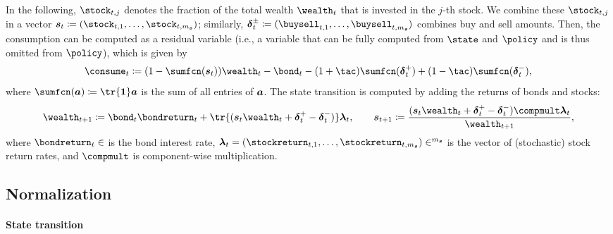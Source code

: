 In the following,
$\stock_{t,j}$ denotes the fraction of the total wealth $\wealth_t$
that is invested in the $j$-th stock.
We combine these  $\stock_{t,j}$
in a vector $\vstock_t \ceq (\stock_{t,1}, \dotsc, \stock_{t,m_{\vstock}})$;
similarly, $\vbuysell_t \ceq (\buysell_{t,1}, \dotsc, \buysell_{t,m_{\vstock}})$
combines buy and sell amounts.
Then, the consumption can be computed as a residual variable
(i.e., a variable that can be fully computed from $\state$ and $\policy$
and is thus omitted from $\policy$),
which is given by
\begin{equation}
  \consume_t
  \ceq (1 - \sumfcn(\vstock_t)) \wealth_t - \bond_t -
  (1 + \tac) \sumfcn(\vbuy_t) + (1 - \tac) \sumfcn(\vsell_t),
\end{equation}
where $\sumfcn(\*a) \ceq \tr{\*1} \*a$
is the sum of all entries of ${\boldsymbol{a}}$.
The state transition is computed by adding the returns of bonds and stocks:%
\begin{equation}
  \wealth_{t+1}
  \ceq \bond_t \bondreturn_t +
  \tr{(\vstock_t \wealth_t + \vbuy_t - \vsell_t)} \vstockreturn_t,\qquad
  \vstock_{t+1}
  \ceq \frac{
    (\vstock_t \wealth_t + \vbuy_t - \vsell_t) \compmult \vstockreturn_t
  }{\wealth_{t+1}},
\end{equation}
where $\bondreturn_t \in \real$ is the bond interest rate,
$
  \vstockreturn_t
  = (\stockreturn_{t,1}, \dotsc, \stockreturn_{t,m_{\vstock}})
  \in \real^{m_{\vstock}}
$
is the vector of (stochastic) stock return rates, and
$\compmult$ is component-wise multiplication.



\subsection{Normalization}
\label{sec:832normalized}

\paragraph{State transition}

